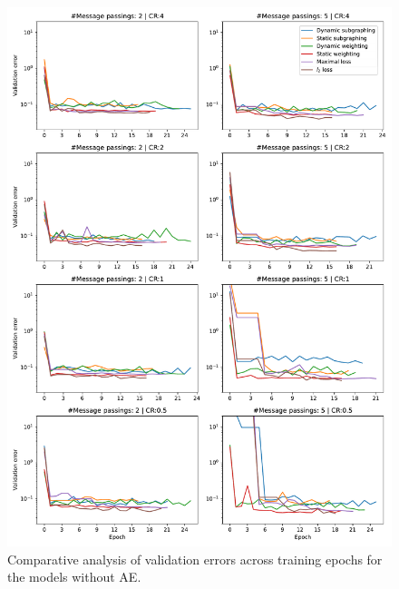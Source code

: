 \documentclass[12pt,a4paper]{report}
\begin{document}
\begin{figure}\centering
\includegraphics[width=1\linewidth,keepaspectratio]{gnn.pdf}
\caption{Comparative analysis of validation errors across training epochs for the models without AE.}\label{fig:gnn}
\end{figure}
\end{document}
